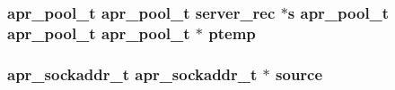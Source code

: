 \subsubsection[{\texorpdfstring{ptemp}{ptemp}}]{ {\bf apr\+\_\+pool\+\_\+t} {\bf apr\+\_\+pool\+\_\+t} {\bf server\+\_\+rec} $\ast${\bf s} {\bf apr\+\_\+pool\+\_\+t} {\bf apr\+\_\+pool\+\_\+t} {\bf apr\+\_\+pool\+\_\+t} $\ast$ ptemp}\hypertarget{group__AP__EXPR_gaab85d20515306c350c88fbc8f58673b7}{}\label{group__AP__EXPR_gaab85d20515306c350c88fbc8f58673b7}
\subsubsection[{\texorpdfstring{source}{source}}]{ {\bf apr\+\_\+sockaddr\+\_\+t} {\bf apr\+\_\+sockaddr\+\_\+t} $\ast$ source}\hypertarget{group__AP__EXPR_ga0e8eb33ac3362aea4e83d2c415b2dc17}{}\label{group__AP__EXPR_ga0e8eb33ac3362aea4e83d2c415b2dc17}

